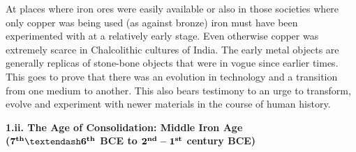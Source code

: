 At places where iron ores were easily available or also in those societies where only copper was being used (as against bronze) iron must have been experimented with at a relatively early stage. Even otherwise copper was extremely scarce in Chalcolithic cultures of India. The early metal objects are generally replicas of stone-bone objects that were in vogue since earlier times. This goes to prove that there was an evolution in technology and a transition from one medium to another. This also bears testimony to an urge to transform, evolve and experiment with newer materials in the course of human history.

\vspace{.5cm}

\textbf{\large 1.ii. The Age of Consolidation: Middle Iron Age\\ ({$\mathbf{7^{\rm \bf th} – 6^{\rm \bf th}}$} BCE to $\mathbf{ 2^{\rm \bf  nd} -1^{\rm \bf st}}$ century BCE)}

\vspace{.3cm}

